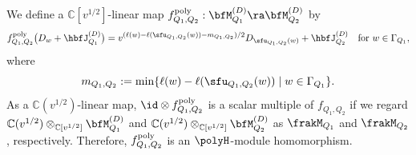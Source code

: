 \documentclass[12pt, reqno]{amsart}
\theoremstyle{plain}
\theoremstyle{definition}
\numberwithin{equation}{section}
\numberwithin{figure}{section}
\numberwithin{table}{section}
\def\C{\mathbb C}
\begin{document}
We define a  $\C[v^{1/2}]$-linear map $f^{\rm poly}_{Q_1,Q_2}:\bfM^{(D)}_{Q_1} \ra \bfM^{(D)}_{Q_2}$ by
\[
f^{\rm poly}_{Q_1,Q_2}
\bigl(
D_w+\hbfJ^{(D)}_{Q_1}
\bigr)
=
v^{(\ell(w)-\ell(\sfu_{Q_1,Q_2}(w))-m_{Q_1,Q_2})/2}
D_{\sfu_{Q_1,Q_2}(w)}
+\hbfJ^{(D)}_{Q_2} \quad\text{for $w \in \Gamma_{Q_1}$},
\]
where
\[
m_{Q_1,Q_2}
:=
\min\{
\ell(w)-\ell(\sfu_{Q_1, Q_2}(w))
\mid
w\in\Gamma_{Q_1}
\}.
\]
As a $\C(v^{1/2})$-linear map, $\id \otimes f^{\rm poly}_{Q_1,Q_2}$ is a scalar multiple of $f_{Q_1, Q_2}$ if we regard $\C(v^{1/2}) \otimes_{\C[v^{1/2}]} \bfM^{(D)}_{Q_1}$ and $\C(v^{1/2}) \otimes_{\C[v^{1/2}]} \bfM^{(D)}_{Q_2}$ as
$\frakM_{Q_1}$ and $\frakM_{Q_2}$, respectively.
Therefore,  $f^{\rm poly}_{Q_1, Q_2}$ is an  $\polyH$-module homomorphism.
\end{document}
